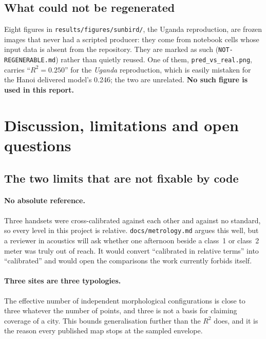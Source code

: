 \documentclass[11pt,a4paper]{article}
\newcommand{\pth}[1]{\texttt{\small #1}}
\begin{document}
\subsection{What could not be regenerated}

Eight figures in \pth{results/figures/sunbird/}, the Uganda reproduction,
are frozen images that never had a scripted producer: they come from notebook
cells whose input data is absent from the repository. They are marked as such
(\pth{NOT-REGENERABLE.md}) rather than quietly reused. One of them,
\pth{pred\_vs\_real.png}, carries ``$R^2 = 0.250$'' for the \emph{Uganda}
reproduction, which is easily mistaken for the Hanoi delivered model's 0.246; the
two are unrelated. \textbf{No such figure is used in this report.}

\section{Discussion, limitations and open questions}

\subsection{The two limits that are not fixable by code}

\paragraph{No absolute reference.} Three handsets were cross-calibrated against
each other and against no standard, so every level in this project is relative.
\pth{docs/metrology.md} argues this well, but a reviewer in acoustics will ask
whether one afternoon beside a class~1 or class~2 meter was truly out of reach.
It would convert ``calibrated in relative terms'' into ``calibrated'' and would
open the comparisons the work currently forbids itself.

\paragraph{Three sites are three typologies.} The effective number of independent
morphological configurations is close to three whatever the number of points, and
three is not a basis for claiming coverage of a city. This bounds generalisation
further than the $R^2$ does, and it is the reason every published map stops at
the sampled envelope.
\end{document}
